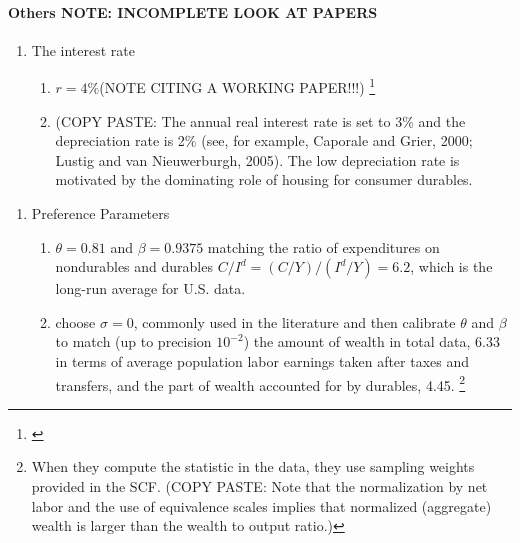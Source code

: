 \documentclass[a4paper,12pt]{article}
\begin{document}
\paragraph{Others NOTE: INCOMPLETE LOOK AT PAPERS}
\begin{enumerate}
\item The interest rate
\begin{enumerate}
\item \citep{FV&K2011} $r = 4\%$(NOTE CITING A WORKING PAPER!!!) \footnote{\citep{mcgrattan2001}}

\item \citep{hintermaier2010} (COPY PASTE: The annual real interest rate is set to 3\% and the depreciation rate is 2\% (see, for example, Caporale and Grier, 2000; Lustig and van Nieuwerburgh, 2005). The low depreciation rate is motivated by the dominating role of housing for consumer durables.
\end{enumerate}
\end{enumerate}

\begin{enumerate}
\item Preference Parameters
\begin{enumerate}
\item  \citep{FV&K2011} $\theta = 0.81$ and $\beta = 0.9375$ matching the ratio of expenditures on nondurables and durables $C/I^{d} = (C/Y)/(I^{d}/Y) = 6.2$, which is the long-run average for U.S. data.

\item \cite{hintermaier2010} choose $\sigma = 0$, commonly used in the literature and then calibrate $\theta$ and $\beta$ to match (up to precision $10^{-2}$) the amount of wealth in total data, 6.33 in terms of average population labor earnings taken after taxes and transfers, and the part of wealth accounted for by durables, 4.45. \footnote{When they compute the statistic in the data, they use sampling weights provided in the SCF. (COPY PASTE: Note that the normalization by net labor and the use of equivalence scales implies that normalized (aggregate) wealth is larger than the wealth to output ratio.)}
\end{enumerate}
\end{enumerate}
\end{document}
